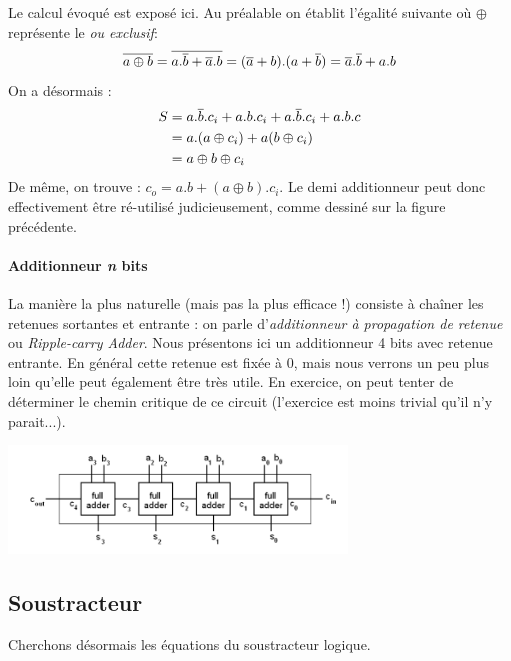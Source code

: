 Le calcul évoqué est exposé ici. Au préalable on établit l'égalité suivante où $\oplus$ représente le {\it ou exclusif}:
$$\overline{a\oplus b}=\overline{a.\overline{b}+\overline{a}.b}=(\overline{a}+b).(a+\overline{b})=\overline{a}.\overline{b}+a.b$$
On a désormais :
\begin{align}
S  &= a.\overline{b}.c_i + a.b.c_i + a.\overline{b}.c_i + a.b.c\\
   &= a.(a\oplus c_i) + a (b\oplus c_i)\\
   &= a \oplus b \oplus c_i
\end{align}
De même, on trouve : $c_o=a.b+(a\oplus b).c_i$.
Le demi additionneur peut donc effectivement être ré-utilisé judicieusement, comme dessiné sur la figure précédente.

\paragraph{Additionneur {\it n} bits}
La manière la plus naturelle (mais pas la plus efficace !) consiste à chaîner les retenues sortantes et entrante : on parle d'{\it additionneur à propagation de retenue} ou {\it Ripple-carry Adder}.
Nous présentons ici un additionneur 4 bits avec retenue entrante. En général cette retenue est fixée à 0, mais nous verrons un peu plus loin qu'elle peut également être très utile. En exercice, on peut tenter de déterminer le chemin critique de ce circuit (l'exercice
est moins trivial qu'il n'y parait...).
\begin{center}
  \centering
  \includegraphics[width=9cm]{./figures/add-6-rc.png}
\end{center}

\subsection{Soustracteur}
Cherchons désormais les équations du soustracteur logique.
